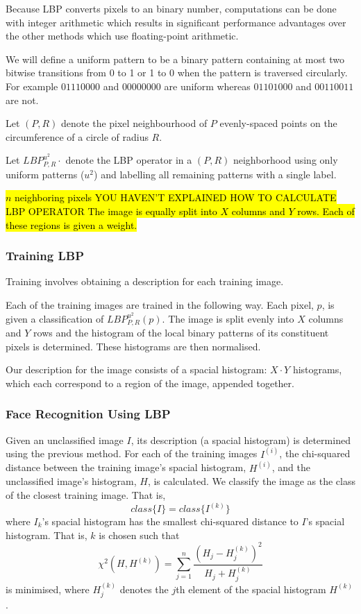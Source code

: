 \documentclass{article}
\begin{document}
Because LBP converts pixels to an binary number, computations can be done with integer arithmetic which results in significant performance advantages over the other methods which use floating-point arithmetic.

We will define a uniform pattern to be a binary pattern containing at most two bitwise transitions from 0 to 1 or 1 to 0 when the pattern is traversed circularly. For example $01110000$ and $00000000$ are uniform whereas $01101000$ and $00110011$ are not.

Let $(P, R)$ denote the pixel neighbourhood of $P$ evenly-spaced points on the circumference of a circle of radius $R$.

Let $LBP^{u^2}_{P,R}\cdot$ denote the LBP operator in a $(P, R)$ neighborhood using only uniform patterns ($u^2$) and labelling all remaining patterns with a single label.


\hl{$n$ neighboring pixels 
YOU HAVEN'T EXPLAINED HOW TO CALCULATE LBP OPERATOR
The image is equally split into $X$ columns and $Y$ rows. Each of these regions is given a weight.}
\subsubsection{Training LBP}
Training involves obtaining a description for each training image.

Each of the training images are trained in the following way. Each pixel, $p$, is given a classification of $LBP_{P,R}^{u^2}(p)$. The image is split evenly into $X$ columns and $Y$ rows and the histogram of the local binary patterns of its constituent pixels is determined. These histograms are then normalised.

Our description for the image consists of a spacial histogram: $X\cdot Y$ histograms, which each correspond to a region of the image, appended together.

\subsubsection{Face Recognition Using LBP}
Given an unclassified image $I$, its description (a spacial histogram) is determined using the previous method. For each of the training images $I^{(i)}$, the chi-squared distance between the training image's spacial histogram, $H^{(i)}$, and the unclassified image's histogram, $H$, is calculated.
We classify the image as the class of the closest training image. That is,
\begin{equation}
	class\{I\} = class\{I^{(k)}\}
\end{equation}
where $I_k$'s spacial histogram has the smallest chi-squared distance to $I$'s spacial histogram. That is, $k$ is chosen such that
\begin{equation}
	\chi^2(H, H^{(k)}) = \sum_{j=1}^{n}\frac{(H_j - H^{(k)}_j)^2}{H_j + H^{(k)}_j}
\end{equation}
is minimised, where $H^{(k)}_j$ denotes the $j$th element of the spacial histogram $H^{(k)}$.
\end{document}
